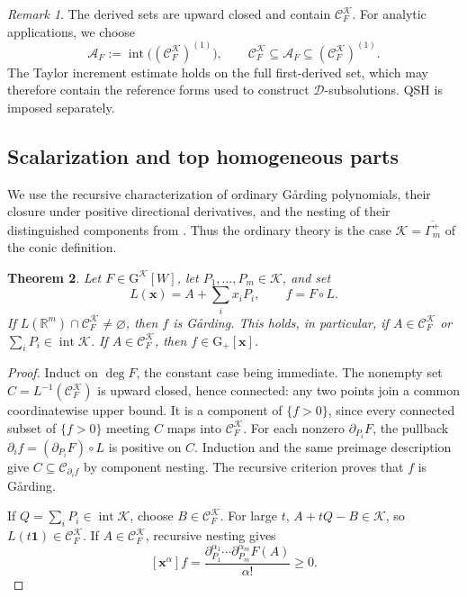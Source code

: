 \documentclass[oneside,english,letterpaper]{amsart}
\numberwithin{equation}{section}
\theoremstyle{plain}
\newtheorem{thm}{Theorem}[section]
\theoremstyle{definition}
\theoremstyle{remark}
\newtheorem{rem}[thm]{Remark}
\def\x{\mathbf{x}}
\def\one{\mathbf{1}}
\def\GS{\mathrm G}
\begin{document}
\begin{rem}
\label{rem:derived-admissible-region}
The derived sets are upward closed and contain
$\mathcal C_F^{\mathcal K}$. For analytic applications, we choose
\[
\mathcal A_F:=\operatorname{int}\bigl((\mathcal C_F^{\mathcal K})^{(1)}\bigr),
\qquad
\mathcal C_F^{\mathcal K}\subseteq\mathcal A_F
\subseteq(\mathcal C_F^{\mathcal K})^{(1)}.
\]
The Taylor increment estimate holds on the full first-derived set,
which may therefore contain the reference forms used to construct
$\mathcal D$-subsolutions. QSH is imposed separately. 
\end{rem}


\subsection{Scalarization and top homogeneous parts}

We use the recursive characterization of ordinary G{\aa}rding
polynomials, their closure under positive directional derivatives,
and the nesting of their distinguished components from
\cite{Fang-MaGard}. Thus the ordinary theory is the case
$\mathcal K=\overline{\Gamma_m^+}$ of the conic definition.


\begin{thm}
\label{thm:affine-scalarization-K-Garding}
Let $F\in\GS^{\mathcal K}[W]$, let $P_1,\ldots,P_m\in\mathcal K$,
and set
\begin{equation}\label{add3}
L(\x)=A+\sum_i x_iP_i,\qquad f=F\circ L.
\end{equation}
If    $L(\mathbb R^m)\cap\mathcal C_F^{\mathcal K}\neq\varnothing$,   then $f$
is G{\aa}rding. This holds, in particular, if
$A\in\mathcal C_F^{\mathcal K}$ or
$\sum_iP_i\in\operatorname{int}\mathcal K$.
If $A\in\mathcal C_F^{\mathcal K}$, then $f\in\GS_+[\x]$.
\end{thm}
\begin{proof}
Induct on $\deg F$, the constant case being immediate.
The nonempty set $C=L^{-1}(\mathcal C_F^{\mathcal K})$ is upward
closed, hence connected: any two points join a common coordinatewise
upper bound. It is a component of $\{f>0\}$, since every connected
subset of $\{f>0\}$ meeting $C$ maps into $\mathcal C_F^{\mathcal K}$.
For each nonzero $\partial_{P_i}F$, the pullback
$\partial_i f=(\partial_{P_i}F)\circ L$ is positive on $C$.
Induction and the same preimage description give
$C\subseteq\mathcal C_{\partial_i f}$ by component nesting. The recursive
criterion proves that $f$ is G{\aa}rding.

If $Q=\sum_iP_i\in\operatorname{int}\mathcal K$, choose
$B\in\mathcal C_F^{\mathcal K}$. For large $t$,
$A+tQ-B\in\mathcal K$, so $L(t\one)\in\mathcal C_F^{\mathcal K}$.
If $A\in\mathcal C_F^{\mathcal K}$, recursive nesting gives
\[
[\x^\alpha]f
=\frac{\partial_{P_1}^{\alpha_1}\cdots
\partial_{P_m}^{\alpha_m}F(A)}{\alpha!}\geq0.
\]
\end{proof}
\end{document}
